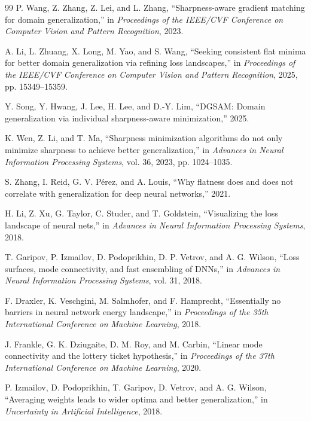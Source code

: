 \documentclass[11pt,a4paper]{article}
\begin{document}
\begin{thebibliography}{99}
P. Wang, Z. Zhang, Z. Lei, and L. Zhang,
``Sharpness-aware gradient matching for domain generalization,''
in \emph{Proceedings of the IEEE/CVF Conference on Computer Vision and Pattern Recognition}, 2023.

A. Li, L. Zhuang, X. Long, M. Yao, and S. Wang,
``Seeking consistent flat minima for better domain generalization via refining loss landscapes,''
in \emph{Proceedings of the IEEE/CVF Conference on Computer Vision and Pattern Recognition}, 2025, pp. 15349--15359.

Y. Song, Y. Hwang, J. Lee, H. Lee, and D.-Y. Lim,
``DGSAM: Domain generalization via individual sharpness-aware minimization,'' 2025.

K. Wen, Z. Li, and T. Ma,
``Sharpness minimization algorithms do not only minimize sharpness to achieve better generalization,''
in \emph{Advances in Neural Information Processing Systems}, vol. 36, 2023, pp. 1024--1035.

S. Zhang, I. Reid, G. V. P\'erez, and A. Louis,
``Why flatness does and does not correlate with generalization for deep neural networks,'' 2021.

H. Li, Z. Xu, G. Taylor, C. Studer, and T. Goldstein,
``Visualizing the loss landscape of neural nets,''
in \emph{Advances in Neural Information Processing Systems}, 2018.

T. Garipov, P. Izmailov, D. Podoprikhin, D. P. Vetrov, and A. G. Wilson,
``Loss surfaces, mode connectivity, and fast ensembling of DNNs,''
in \emph{Advances in Neural Information Processing Systems}, vol. 31, 2018.

F. Draxler, K. Veschgini, M. Salmhofer, and F. Hamprecht,
``Essentially no barriers in neural network energy landscape,''
in \emph{Proceedings of the 35th International Conference on Machine Learning}, 2018.

J. Frankle, G. K. Dziugaite, D. M. Roy, and M. Carbin,
``Linear mode connectivity and the lottery ticket hypothesis,''
in \emph{Proceedings of the 37th International Conference on Machine Learning}, 2020.

P. Izmailov, D. Podoprikhin, T. Garipov, D. Vetrov, and A. G. Wilson,
``Averaging weights leads to wider optima and better generalization,''
in \emph{Uncertainty in Artificial Intelligence}, 2018.


\end{thebibliography}
\end{document}
